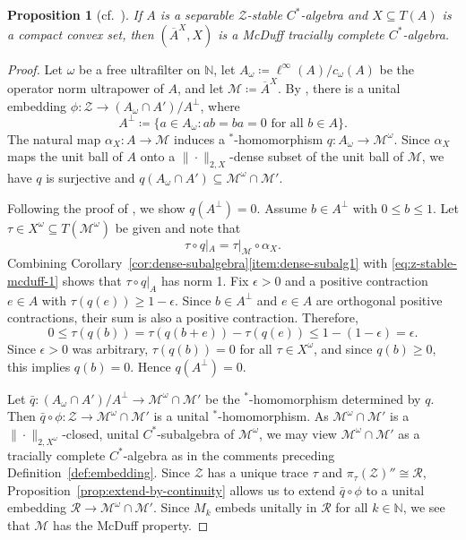 \documentclass[a4paper,11pt]{amsart}
\newtheorem{proposition}[theorem]{Proposition}
\theoremstyle{definition}
\numberwithin{equation}{section}
\numberwithin{theorem}{section}
\newcommand{\R}{\mathcal R}
\newcommand{\N}{\mathbb N}
\newcommand{\M}{\mathcal{M}}
\newcommand{\completion}[2]{\overline{#1}^{#2}}
\begin{document}
\begin{proposition}[{cf.\ \cite[Proposition~2.3]{CETWW}}]\label{prop:z-stable-mcduff}
If $A$ is a separable $\mathcal Z$-stable $C^*$-algebra and $X \subseteq T(A)$ is a compact convex set, then $(\completion{A}{X}, X)$ is a McDuff tracially complete $C^*$-algebra.
\end{proposition}
\begin{proof}
Let $\omega$ be a free ultrafilter on $\mathbb N$, let $A_\omega \coloneqq \ell^\infty(A) / c_\omega(A)$ be the operator norm ultrapower of $A$, and let $\M \coloneqq \completion{A}{X}$.  By \cite[Proposition~4.4(4)]{Kir06}, there is a unital embedding $\phi \colon \mathcal Z \rightarrow (A_\omega \cap A')/A^\perp$, where 
\begin{equation}
    A^\perp \coloneqq \{a \in A_\omega : ab = ba = 0 \text{ for all } b \in A \}.
\end{equation}
The natural map $\alpha_X \colon A \rightarrow \M$ induces a $^*$-homomorphism $q \colon A_\omega \rightarrow \M^\omega$.  Since $\alpha_X$ maps the unit ball of $A$ onto a $\|\cdot\|_{2, X}$-dense subset of the unit ball of $\M$, we have $q$ is surjective and $q(A_\omega \cap A') \subseteq \M^\omega \cap \M'$.

Following the proof of \cite[Lemma~1.10]{CETWW}, we show $q(A^\perp) = 0$.  Assume $b \in A^\perp$ with $0 \leq b \leq 1$.  Let $\tau \in X^\omega \subseteq T(\mathcal M^\omega)$ be given and note that
\begin{equation}\label{eq:z-stable-mcduff-1}
  \tau \circ q|_A = \tau|_{\mathcal M} \circ \alpha_X.
\end{equation}
Combining Corollary~\ref{cor:dense-subalgebra}\ref{item:dense-subalg1} with \eqref{eq:z-stable-mcduff-1} shows that $\tau \circ q|_A$ has norm 1.  Fix $\epsilon > 0$ and a positive contraction $e\in A$ with $\tau(q(e)) \geq 1 - \epsilon$.  Since $b \in A^\perp$ and $e \in A$ are orthogonal positive contractions, their sum is also a positive contraction.  Therefore,
\begin{equation}\label{eq:z-stable-mcduff-2}
  0 \leq \tau(q(b)) = \tau(q(b + e)) - \tau(q(e)) \leq 1 - (1 - \epsilon) = \epsilon.
\end{equation}
Since $\epsilon > 0$ was arbitrary, $\tau(q(b)) = 0$ for all $\tau \in X^\omega$, and since $q(b) \geq 0$, this implies $q(b) = 0$.  Hence $q(A^\perp) = 0$.

Let $\bar{q} \colon (A_\omega \cap A') / A^\perp \rightarrow \M^\omega \cap \M'$ be the $^*$-homomorphism determined by $q$.  Then $\bar{q} \circ \phi \colon \mathcal Z \rightarrow \M^\omega \cap \M'$ is a unital $^*$-homomorphism.  As $\M^\omega \cap \M'$ is a $\|\cdot\|_{2, X^\omega}$-closed, unital $C^*$-subalgebra of $\M^\omega$, we may view $\M^\omega \cap \M'$ as a tracially complete $C^*$-algebra as in the comments preceding Definition~\ref{def:embedding}.  Since $\mathcal Z$ has a unique trace $\tau$ and $\pi_\tau(\mathcal Z)'' \cong \R$, Proposition~\ref{prop:extend-by-continuity} allows us to extend $\bar q \circ \phi$ to a unital embedding $\R \rightarrow \M^\omega \cap \M'$. Since $M_k$ embeds unitally in $\R$ for all $k \in \N$, we see that $\M$ has the McDuff property. 
\end{proof}
\end{document}
